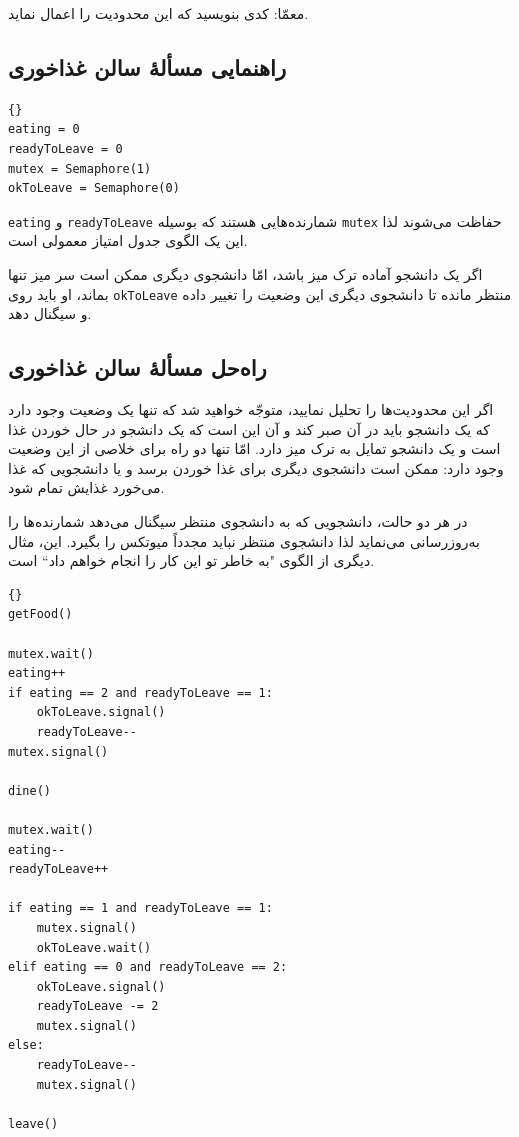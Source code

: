 \documentclass{book}
\newcommand{\clearemptydoublepage}{}%
\begin{document}
    معمّا: کدی بنویسید که این محدودیت را اعمال نماید. 


\clearemptydoublepage
\subsection{راهنمایی مسألهٔ سالن غذاخوری}

\begin{latin}
\begin{lstlisting}[title=\rl{راهنمایی مسألهٔ سالن غذاخوری}]{}
eating = 0
readyToLeave = 0
mutex = Semaphore(1)
okToLeave = Semaphore(0)
\end{lstlisting}
\end{latin}

    {\tt eating} و {\tt readyToLeave}
    شمارنده‌هایی هستند که بوسیله {\tt mutex} حفاظت می‌شوند لذا این یک الگوی جدول امتیاز معمولی است. 
    

    اگر یک دانشجو آماده ترک میز باشد، امّا دانشجوی دیگری ممکن است سر میز  تنها بماند، او باید روی {\tt okToLeave}  منتظر مانده تا 
    دانشجوی دیگری این وضعیت را تغییر داده و سیگنال دهد. 


\clearemptydoublepage
\subsection{راه‌حل مسألهٔ سالن غذاخوری}

    اگر این محدودیت‌ها را تحلیل نمایید، متوجّه خواهید شد که تنها یک وضعیت وجود دارد که یک دانشجو باید در آن صبر کند و آن این است که یک 
    دانشجو در حال خوردن غذا است و یک دانشجو تمایل به ترک میز دارد. امّا تنها دو راه برای خلاصی از این وضعیت وجود دارد:
    ممکن است دانشجوی دیگری برای غذا خوردن برسد و یا دانشجویی که غذا می‌خورد غذایش تمام شود. 

    در هر دو حالت، دانشجویی که به دانشجوی منتظر سیگنال می‌دهد شمارنده‌ها را به‌روزرسانی می‌نماید لذا دانشجوی منتظر نباید مجدداً میوتکس را بگیرد. 
    این، مثال دیگری از الگوی "به خاطر تو این کار را انجام خواهم داد`` است.

\begin{latin}
\begin{lstlisting}[title=\rl{راه‌حل مسألهٔ سالن غذاخوری}]{}
getFood()

mutex.wait()
eating++
if eating == 2 and readyToLeave == 1:
    okToLeave.signal()
    readyToLeave--
mutex.signal()

dine()

mutex.wait()
eating--
readyToLeave++

if eating == 1 and readyToLeave == 1:
    mutex.signal()
    okToLeave.wait()
elif eating == 0 and readyToLeave == 2:
    okToLeave.signal()
    readyToLeave -= 2
    mutex.signal()
else:
    readyToLeave--
    mutex.signal()

leave()
\end{lstlisting}
\end{latin}
\end{document}
